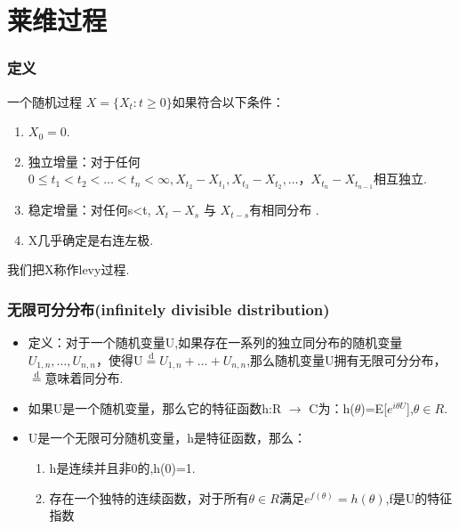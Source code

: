 \documentclass{beamer}
\begin{document}
	
	
	
\section{莱维过程}

\begin{frame}
\frametitle{定义}
一个随机过程 ${X=\{X_{t}:t\geq 0\}}$如果符合以下条件： 
\begin{enumerate}[(1)]
\item $X_{0}=0$.
\item 独立增量：对于任何$0\leq t_{1} < t_{2} < \dots < t_{n} < \infty ,X_{t_2}-X_{t_1},X_{t_3}-X_{t_2},\dots，X_{t_n}-X_{t_{n-1}}$相互独立.
\item 稳定增量：对任何s<t, $X_{t}-X_{s}$ 与 $X_{t-s}$有相同分布 .  
\item X几乎确定是右连左极.
\end{enumerate}
我们把X称作levy过程.
\end{frame}

\begin{frame}
\frametitle{无限可分分布(infinitely divisible distribution)}
\begin{itemize}
\item 定义：对于一个随机变量U,如果存在一系列的独立同分布的随机变量$U_{1,n},\dots,U_{n,n}$，使得U$\overset{\text{d}}{=}U_{1,n}+\dots+U_{n,n}$,那么随机变量U拥有无限可分分布，$\overset{\text{d}}{=}$意味着同分布.
\item 如果U是一个随机变量，那么它的特征函数h:R $\to$ C为：h($\theta$)=E[$e^{i\theta U}$],$\theta \in R$.
\item U是一个无限可分随机变量，h是特征函数，那么：
\begin{enumerate}[(1)]
\item h是连续并且非0的,h(0)=1.
\item 存在一个独特的连续函数，对于所有$\theta \in R$满足$e^{f(\theta)}=h(\theta)$,f是U的特征指数
\end{enumerate}
\end{itemize}
\end{frame}
\end{document}
